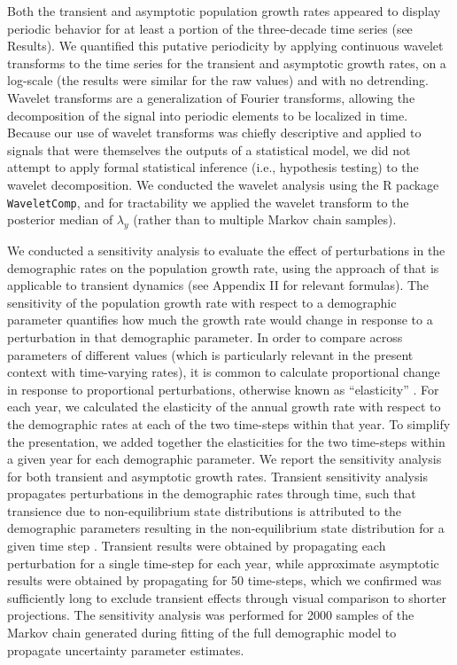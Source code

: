 \documentclass[11pt]{article}
\begin{document}
Both the transient and asymptotic population growth rates appeared to display periodic
behavior for at least a portion of the three-decade time series (see Results).
We quantified this putative periodicity by applying continuous wavelet transforms to 
the time series for the transient and asymptotic growth rates, 
on a log-scale (the results were similar for the raw values) 
and with no detrending.
Wavelet transforms are a generalization of Fourier transforms,
allowing the decomposition of the signal into periodic elements to be localized in time. 
Because our use of wavelet transforms was chiefly descriptive and applied to signals 
that were themselves the outputs of a statistical model,
we did not attempt to apply formal statistical inference (i.e., hypothesis testing)
to the wavelet decomposition.
We conducted the wavelet analysis using the R package \texttt{WaveletComp},
and for tractability we applied the wavelet transform 
to the posterior median of $\lambda_y$ (rather than to multiple Markov chain samples).

We conducted a sensitivity analysis
to evaluate the effect of perturbations 
in the demographic rates on the population growth rate, 
using the approach of \cite{caswell2007sensitivity} 
that is applicable to transient dynamics
(see Appendix II for relevant formulas). 
The sensitivity of the population growth rate with respect to a demographic parameter
quantifies how much the growth rate would change in response to a perturbation in that 
demographic parameter. 
In order to compare across parameters of different values 
(which is particularly relevant in the present context with time-varying rates),
it is common to calculate proportional change in  
response to proportional perturbations,
otherwise known as ``elasticity''  \citep{caswell2001matrix}.
For each year, we calculated the elasticity of the annual growth rate with respect
to the demographic rates at each of the two time-steps within that year.
To simplify the presentation, 
we added together the  elasticities for the two time-steps within a given year 
for each demographic parameter.
We report the sensitivity analysis for both transient and asymptotic growth rates.
Transient sensitivity analysis propagates perturbations in the demographic rates 
through time, 
such that transience due to non-equilibrium state distributions is attributed to the
demographic parameters resulting in the non-equilibrium state distribution 
for a given time step \citep{caswell2007sensitivity}.
Transient results were obtained by propagating each perturbation for
a single time-step for each year,
while approximate asymptotic results were obtained by propagating for 50 time-steps,
which we confirmed was sufficiently long to exclude transient effects 
through visual comparison to shorter projections.
The sensitivity analysis was performed for 2000 samples of the Markov chain generated 
during fitting of the full demographic model to propagate uncertainty parameter estimates.
\end{document}
